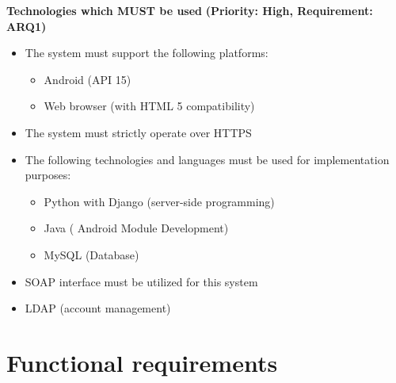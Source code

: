 \documentclass[12pt]{article}
\begin{document}
		\vspace{0.2in}
		
		\begin{flushleft}
				\textbf{Technologies which MUST be used}
				\newline\textbf{(Priority: High, Requirement: ARQ1)}
		\end{flushleft}
			
			\vspace{0.05in}
		\begin{itemize}
					\item The system must support the following platforms: 
						\begin{itemize}
							\item Android (API 15)
							\item Web browser (with HTML 5 compatibility)
						\end{itemize}
						
					\item The system must strictly operate over HTTPS
					\item The following technologies and languages must be used for implementation purposes:
						\begin{itemize}
							\item Python with Django (server-side programming)
							\item Java ( Android Module Development)
							\item MySQL (Database)
						\end{itemize}
						\item SOAP interface must be utilized for this system
						\item LDAP (account management)
		\end{itemize}
		
		\vspace{0.05in}
		
	
	\section{Functional requirements}
	
		\vspace{0.2in}
		
\end{document}
